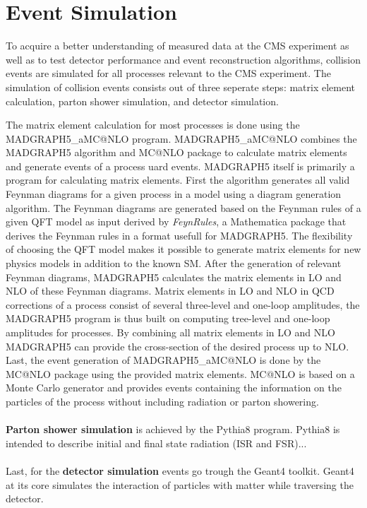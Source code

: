 \section*{Event Simulation}

To acquire a better understanding of measured data at the CMS experiment as well as to test detector performance and event reconstruction algorithms, collision events are simulated for all processes relevant to the CMS experiment. The simulation of collision events consists out of three seperate steps: matrix element calculation, parton shower simulation, and detector simulation.

The matrix element calculation for most processes is done using the MADGRAPH5\_aMC@NLO program. MADGRAPH5\_aMC@NLO combines the MADGRAPH5\cite{Alwall_2011} algorithm and MC@NLO\cite{frixione2010mcnlo} package to calculate matrix elements and generate events of a process uard events. MADGRAPH5 itself is primarily a program for calculating matrix elements. First the algorithm generates all valid Feynman diagrams for a given process in a model using a diagram generation algorithm. The Feynman diagrams are generated based on the Feynman rules of a given QFT model as input derived by \textit{FeynRules}\cite{Christensen_2009}, a Mathematica package that derives the Feynman rules in a format usefull for MADGRAPH5. The flexibility of choosing the QFT model makes it possible to generate matrix elements for new physics models in addition to the known SM. After the generation of relevant Feynman diagrams, MADGRAPH5 calculates the matrix elements in LO and NLO of these Feynman diagrams. Matrix elements in LO and NLO in QCD corrections of a process consist of several three-level and one-loop amplitudes, the MADGRAPH5 program is thus built on computing tree-level and one-loop amplitudes for processes. By combining all matrix elements in LO and NLO MADGRAPH5 can provide the cross-section of the desired process up to NLO. Last, the event generation of MADGRAPH5\_aMC@NLO is done by the MC@NLO\cite{frixione2010mcnlo} package using the provided matrix elements. MC@NLO is based on a Monte Carlo generator\cite{MC} and provides events containing the information on the particles of the process without including radiation or parton showering.\\
\\
\textbf{Parton shower simulation} is achieved by the Pythia8\cite{Sj_strand_2015} program. Pythia8 is intended to describe initial and final state radiation (ISR and FSR)...\\
\\
Last, for the \textbf{detector simulation} events go trough the Geant4\cite{AGOSTINELLI2003250} toolkit. Geant4 at its core simulates the interaction of particles with matter while traversing the detector.
